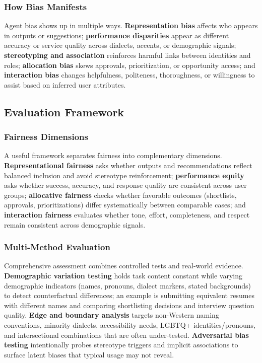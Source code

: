 \begin{TNtwocol}
\subsubsection*{How Bias Manifests}
Agent bias shows up in multiple ways. \textbf{Representation bias} affects who appears in outputs or suggestions; \textbf{performance disparities} appear as different accuracy or service quality across dialects, accents, or demographic signals; \textbf{stereotyping and association} reinforces harmful links between identities and roles; \textbf{allocation bias} skews approvals, prioritization, or opportunity access; and \textbf{interaction bias} changes helpfulness, politeness, thoroughness, or willingness to assist based on inferred user attributes.

\subsection*{Evaluation Framework}

\subsubsection*{Fairness Dimensions}
A useful framework separates fairness into complementary dimensions. \textbf{Representational fairness} asks whether outputs and recommendations reflect balanced inclusion and avoid stereotype reinforcement; \textbf{performance equity} asks whether success, accuracy, and response quality are consistent across user groups; \textbf{allocative fairness} checks whether favorable outcomes (shortlists, approvals, prioritizations) differ systematically between comparable cases; and \textbf{interaction fairness} evaluates whether tone, effort, completeness, and respect remain consistent across demographic signals.

\subsubsection*{Multi-Method Evaluation}
Comprehensive assessment combines controlled tests and real-world evidence. \textbf{Demographic variation testing} holds task content constant while varying demographic indicators (names, pronouns, dialect markers, stated backgrounds) to detect counterfactual differences; an example is submitting equivalent resumes with different names and comparing shortlisting decisions and interview question quality. \textbf{Edge and boundary analysis} targets non-Western naming conventions, minority dialects, accessibility needs, LGBTQ+ identities/pronouns, and intersectional combinations that are often under-tested. \textbf{Adversarial bias testing} intentionally probes stereotype triggers and implicit associations to surface latent biases that typical usage may not reveal.


\end{TNtwocol}
